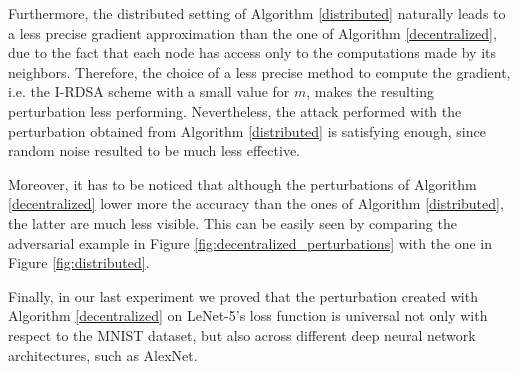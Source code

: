 Furthermore, the
distributed setting of Algorithm \ref{distributed} naturally leads to a less precise gradient approximation than the one of Algorithm \ref{decentralized}, due to the
fact that each node has access only to the computations made by its neighbors. Therefore, the choice of a less precise
method to compute the gradient, i.e. the I-RDSA scheme with a small value for $m$, makes the resulting perturbation
less performing. Nevertheless, the attack performed with the perturbation obtained from Algorithm \ref{distributed} is satisfying enough, since random noise resulted to be much less effective.

Moreover, it has to be noticed that although the perturbations of Algorithm \ref{decentralized} lower more the accuracy than the ones of Algorithm \ref{distributed}, the latter are much less visible. This can be easily seen by comparing the adversarial example in Figure \ref{fig:decentralized_perturbations} with the one in Figure \ref{fig:distributed}.

Finally, in our last experiment we proved that the perturbation created with Algorithm \ref{decentralized} on LeNet-5's loss function is universal
not only with respect to the MNIST dataset, but also across different deep neural network architectures, such as AlexNet.

